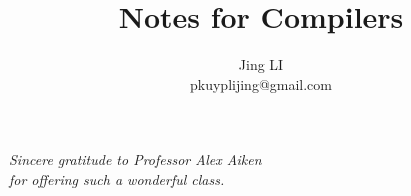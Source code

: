 
\def\PREAMBLE{PREAMBLE}
\title{Notes for Compilers}
\author{Jing LI\\pkuyplijing@gmail.com}

\pagestyle{empty}
\hypersetup{pageanchor=false}
\maketitle
\begin{center}
\emph{Sincere gratitude to Professor Alex Aiken \\for offering such a wonderful class.}
\end{center}
\tableofcontents
\newpage
\hypersetup{pageanchor=true}
\pagestyle{headings}








